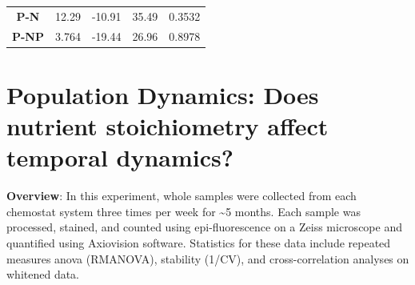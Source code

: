 \documentclass[]{article}
\begin{document}
\begin{longtable}[]{@{}ccccc@{}}
\begin{minipage}[t]{0.13\columnwidth}\centering\strut
\textbf{P-N}
\strut\end{minipage} &
\begin{minipage}[t]{0.08\columnwidth}\centering\strut
12.29
\strut\end{minipage} &
\begin{minipage}[t]{0.08\columnwidth}\centering\strut
-10.91
\strut\end{minipage} &
\begin{minipage}[t]{0.07\columnwidth}\centering\strut
35.49
\strut\end{minipage} &
\begin{minipage}[t]{0.08\columnwidth}\centering\strut
0.3532
\strut\end{minipage}\tabularnewline
\begin{minipage}[t]{0.13\columnwidth}\centering\strut
\textbf{P-NP}
\strut\end{minipage} &
\begin{minipage}[t]{0.08\columnwidth}\centering\strut
3.764
\strut\end{minipage} &
\begin{minipage}[t]{0.08\columnwidth}\centering\strut
-19.44
\strut\end{minipage} &
\begin{minipage}[t]{0.07\columnwidth}\centering\strut
26.96
\strut\end{minipage} &
\begin{minipage}[t]{0.08\columnwidth}\centering\strut
0.8978
\strut\end{minipage}\tabularnewline
\bottomrule
\end{longtable}

\newpage

\section{Population Dynamics: Does nutrient stoichiometry affect
temporal
dynamics?}\label{population-dynamics-does-nutrient-stoichiometry-affect-temporal-dynamics}

\textbf{Overview}: In this experiment, whole samples were collected from
each chemostat system three times per week for \textasciitilde{}5
months. Each sample was processed, stained, and counted using
epi-fluorescence on a Zeiss microscope and quantified using Axiovision
software. Statistics for these data include repeated measures anova
(RMANOVA), stability (1/CV), and cross-correlation analyses on whitened
data.
\end{document}
